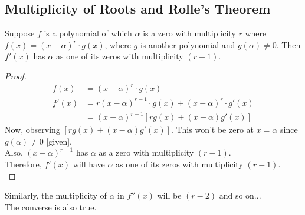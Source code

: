\documentclass[14]{article}
\theoremstyle{definition}
\theoremstyle{case}
\begin{document}
\subsection{Multiplicity of Roots and Rolle's Theorem}
Suppose $f$ is a polynomial of which $\alpha$ is a zero with multiplicity $r$ where $f(x) = (x-\alpha)^r \cdot g(x)$, where $g$ is another polynomial and $g(\alpha) \neq 0$. Then $f'(x)$ has $\alpha$ as one of its zeros with multiplicity $(r - 1)$.
\begin{proof}
\begin{align*}
f(x) &= (x - \alpha)^r \cdot g(x)\\
f'(x) &= r(x - \alpha)^{r-1}\cdot g(x) + (x - \alpha)^r \cdot g'(x)\\
&= (x - \alpha)^{r-1} \left[ r g(x) + (x - \alpha) g'(x) \right]
\end{align*}
Now, observing $\left[ r g(x) + (x - \alpha) g'(x) \right]$. This won't be zero at $x = \alpha$ since $g(\alpha) \neq 0$ [given].\\
Also, $(x - \alpha)^{r-1}$ has $\alpha$ as a zero with multiplicity $(r - 1)$.\\
Therefore, $f'(x)$ will have $\alpha$ as one of its zeros with multiplicity $(r - 1)$.\\
\end{proof}
Similarly, the multiplicity of $\alpha$ in $f''(x)$ will be $(r - 2)$ and so on...\\
The converse is also true.
\pagebreak
\end{document}
